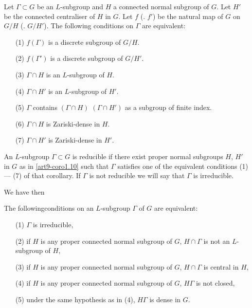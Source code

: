 \begin{coro}\label{art9-coro1.10}
Let $\Gamma \subset G$ be an $L$-subgroup and $H$ a connected normal subgroup of $G$. Let $H'$ be the connected centraliser of $H$ in $G$. Let $f$ (\resp. $f'$) be the natural map of $G$ on $G/H$ (\resp. $G/H'$). The following conditions on $\Gamma$ are equivalent:
\begin{itemize}
\item[(1)] $f(\Gamma)$ is a discrete subgroup of $G / H$.

\item[(2)] $f (\Gamma')$ is a discrete subgroup of $G/H'$.

\item[(3)] $\Gamma \cap H$ is an $L$-subgroup of $H$.

\item[(4)] $\Gamma \cap H'$ is an $L$-subgroup of $H'$.

\item[(5)] $\Gamma$ contains $(\Gamma \cap H)$ $(\Gamma \cap H')$ as a subgroup of finite index.

\item[(6)] $\Gamma \cap H$ is Zariski-dense in $H$.

\item[(7)] $\Gamma \cap H'$ is Zariski-dense in $H'$.
\end{itemize}
\end{coro}

\setcounter{definition}{10}
\begin{definition}\label{art9-def1.11}
An $L$-subgroup $\Gamma \subset G$ is reducible if there exist proper normal subgroups  $H$, $H'$ in $G$ as in \ref{art9-coro1.10} such that $\Gamma$ satisfies one of the equivalent conditions (1) --- (7) of that  corollary. If $\Gamma$ is not reducible we will say that $\Gamma$ is irreducible.
\end{definition}

We have then 

\begin{coro}\label{art9-coro1.12}
The following\pageoriginale conditions on an $L$-subgroup $\Gamma$ of $G$ are equivalent:
\begin{itemize}
\item[(1)] $\Gamma$ is irreducible,

\item[(2)] if $H$ is any proper connected normal subgroup of $G$, $H \cap \Gamma$ is not an $L$-subgroup of $H$, 

\item[(3)] if $H$ is any proper connected normal subgroup of $G$, $H \cap \Gamma$ is central in $H$,

\item[(4)] if $H$ is any proper connected normal subgroup of $G$, $H \Gamma$ is not closed,

\item[(5)] under the same hypothesis as in (4), $H \Gamma$ is dense in $G$.
\end{itemize}
\end{coro}

